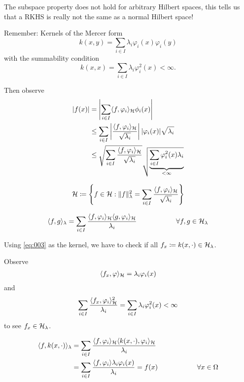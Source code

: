\begin{aremark}
    The subspace property does not hold for arbitrary Hilbert spaces, this tells us that a RKHS is really not the same as a normal Hilbert space!
\end{aremark}


Remember: Kernels of the Mercer form 
\[k(x,y)=\sum_{i\in I}\lambda_i \varphi_i(x)\varphi_i(y)\]
with the summability condition 
\[k(x,x)=\sum_{i\in I}\lambda_i \varphi_i^2(x)<\infty.\]

Then observe 
\begin{align*}
    |f(x)|&=\left\vert \sum_{i\in I}\langle f,\varphi_i\rangle_{\mathcal{H}}\phi_i(x)\right\vert\\
    &\leq\sum_{i\in I}\left\vert \frac{\langle f,\varphi_i\rangle_{\mathcal{H}}}{\sqrt{\lambda_i}}\right\vert|\varphi_i(x)|\sqrt{\lambda_i}\\
    &\leq \sqrt{\sum_{i\in I}\frac{\langle f,\varphi_i\rangle_{\mathcal{H}}}{\sqrt{\lambda_i}}}\sqrt{\underbrace{\sum_{i\in I}\varphi_i^2(x)\lambda_i}_{<\infty}}
\end{align*}

\[\mathcal{H}\coloneqq\left\{f\in \mathcal{H}: \Vert f\Vert_\lambda^2=\sum_{i\in I}\frac{\langle f,\varphi_i\rangle_{\mathcal{H}}}{\sqrt{\lambda_i}}\right\}\]

\begin{equation}\label{eq:003}
    \langle f,g\rangle_\lambda = \sum_{i\in I}\frac{\langle f,\varphi_i\rangle_{\mathcal{H}}\langle g,\varphi_i\rangle_{\mathcal{H}}}{\lambda_i}\hspace{2cm} \forall f,g\in\mathcal{H}_\lambda  
\end{equation}

Using \ref{eq:003} as the kernel, we have to check if all $f_x\coloneqq k(x,\cdot)\in\mathcal{H}_\lambda$.

Observe 
\begin{align*}
    \langle f_x,\varphi\rangle_{\mathcal{H}}=\lambda_i\varphi_i(x)
\end{align*}
and \begin{align*}
    \sum_{i\in I}\frac{\langle f_x,\varphi_i\rangle_{\mathcal{H}}^2}{\lambda_i}=\sum_{i\in I}\lambda_i \varphi_i^2(x)<\infty
\end{align*}
to see $f_x\in \mathcal{H}_\lambda$.


\begin{align*}
    \langle f,k(x,\cdot)\rangle_\lambda&= \sum_{i\in I}\frac{\langle f,\varphi_i\rangle_{\mathcal{H}}\langle k(x,\cdot),\varphi_i\rangle_{\mathcal{H}}}{\lambda_i}\\
    &=\sum_{i\in I} \frac{\langle f,\varphi_i\rangle\lambda_i\varphi_i(x)}{\lambda_i}=f(x)\hspace{2cm}\forall x\in\Omega
\end{align*}


